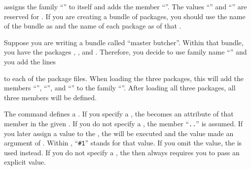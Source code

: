  assigns the family ``'' to itself and adds the
member ``''. The values ``'' and
``'' are reserved for \KOMAScript{}. If you are creating a
bundle of packages, you should use the name of the bundle as 
and the name of each package as  of that .
%
\begin{Example}
  Suppose you are writing a bundle called ``master butcher''. Within that
  bundle, you have the packages , ,
  and . Therefore, you decide to use family name
  ``'' and you add the lines
\begin{lstcode}
\end{lstcode}
  to each of the package files. When loading the three packages, this will
  add the members ``'', ``'',
  and ``'' to the family ``''. After
  loading all three packages, all three members will be defined.
\end{Example}
%
\EndIndexGroup


\begin{Declaration}
\end{Declaration}
The  command defines a . If you specify a
, the  becomes an attribute of that member in the
given . If you do not specify a , the member
``\texttt{.}\texttt{.}'' is assumed. If you
later assign a value to the , the  will be
executed and the value made an argument of . Within
, ``\lstinline{#1}'' stands for that value. If you omit the value,
the  is used instead. If you do not specify a ,
the  then always requires you to pass an explicit value.

